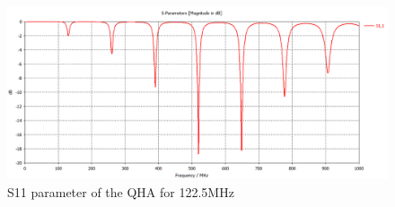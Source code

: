 \begin{figure}[H]
\centering 
\includegraphics[scale = 0.4]{figures/antennas/qha/qha_6_S11}
\caption{S11 parameter of the QHA for 122.5MHz}
\label{fig:QHA_S11}
\end{figure}

